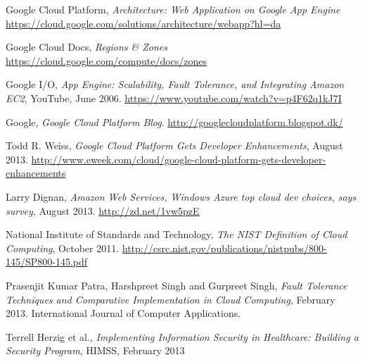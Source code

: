 \documentclass[11pt]{report}
\begin{document}
\begin{thebibliography}{99}
	Google Cloud Platform, \emph{Architecture: Web Application on Google App Engine}
	\url{https://cloud.google.com/solutions/architecture/webapp?hl=da}
	
\bibitem{}
	Google Cloud Docs, \emph{Regions \& Zones}
	\url{https://cloud.google.com/compute/docs/zones}
	
	Google I/O, \emph{App Engine: Scalability, Fault Tolerance, and Integrating Amazon EC2}, YouTube, June 2006.
	\url{https://www.youtube.com/watch?v=p4F62q1kJ7I}
	
	Google, \emph{Google Cloud Platform Blog}.
	\url{http://googlecloudplatform.blogspot.dk/}
	
	Todd R. Weiss, \emph{Google Cloud Platform Gets Developer Enhancements}, August 2013.
	\url{http://www.eweek.com/cloud/google-cloud-platform-gets-developer-enhancements}
	
	Larry Dignan, \emph{Amazon Web Services, Windows Azure top cloud dev choices, says survey}, August 2013.
	\url{http://zd.net/1vw5pzE}
	
	National Institute of Standards and Technology, \emph{The NIST Definition of Cloud Computing}, October 2011.
	\url{http://csrc.nist.gov/publications/nistpubs/800-145/SP800-145.pdf}
	
	Prasenjit Kumar Patra, Harshpreet Singh and Gurpreet Singh, \emph{Fault Tolerance Techniques and Comparative Implementation in Cloud Computing}, February 2013.
	International Journal of Computer Applications.
	
	Terrell Herzig et al., \emph{Implementing Information Security in Healthcare: Building a Security Program}, HIMSS, February 2013

\end{thebibliography}
\end{document}
